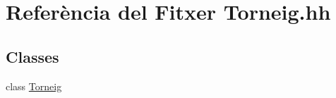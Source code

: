 \hypertarget{_torneig_8hh}{}\section{Referència del Fitxer Torneig.\+hh}
\label{_torneig_8hh}
\subsection*{Classes}
\begin{DoxyCompactItemize}
\item 
class \mbox{\hyperlink{class_torneig}{Torneig}}
\end{DoxyCompactItemize}
